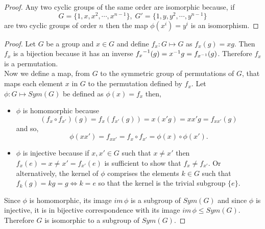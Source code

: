 \documentclass[MathsNotesBase.tex]{subfiles}
\begin{document}
{	
	
	\begin{proof}
		Any two cyclic groups of the same order are isomorphic because, if
		\[ G = \{1, x, x^2, \cdots, x^{n-1}\}, \; G' = \{1, y, y^2, \cdots, y^{n-1}\} \]
		are two cyclic groups of order $n$ then the map $\phi(x^i) = y^i$ is an isomorphism.
	\end{proof}

	\medskip
	\begin{proof}
		Let $G$ be a group and ${ x \in G }$ and define ${ f_x : G \longmapsto G }$ as ${ f_x(g) = xg }$. Then $f_x$ is a bijection because it has an inverse ${ {f_x}^{-1}(g) = {x}^{-1}g = f_{{x}^{-1}}(g) }$. Therefore $f_x$ is a permutation.\\
		
		Now we define a map, from $G$ to the symmetric group of permutations of $G$, that maps each element $x$ in $G$ to the permutation defined by $f_x$. Let ${ \phi: G \longmapsto Sym(G) }$ be defined as ${ \phi(x) = f_x }$ then,
		\begin{itemize}
			\item{$\phi$ is homomorphic because
				\[ (f_x \circ f_{x'})(g) = f_x(f_{x'}(g)) = x(x'g) = xx'g = f_{xx'}(g) \]
				and so,
				\[ \phi(xx') = f_{xx'} = f_x \circ f_{x'} = \phi(x) \circ \phi(x'). \]
			}
			\item{$\phi$ is injective because if ${ x,x' \in G }$ such that ${ x \neq x' }$ then ${ f_x(e) = x \neq x' = f_{x'}(e) }$ is sufficient to show that ${ f_x \neq f_{x'} }$. Or alternatively, the kernel of $\phi$ comprises the elements ${ k \in G }$ such that ${ f_k(g) = kg = g \iff k = e }$ so that the kernel is the trivial subgroup ${ \{e\} }$.
			}
		\end{itemize}
		Since $\phi$ is homomorphic, its image ${ im\,\phi }$ is a subgroup of ${ Sym(G) }$ and since $\phi$ is injective, it is in bijective correspondence with its image ${ im\,\phi \leq Sym(G) }$.\\
		Therefore $G$ is isomorphic to a subgroup of $Sym(G)$.
	\end{proof}
	
}
\end{document}
